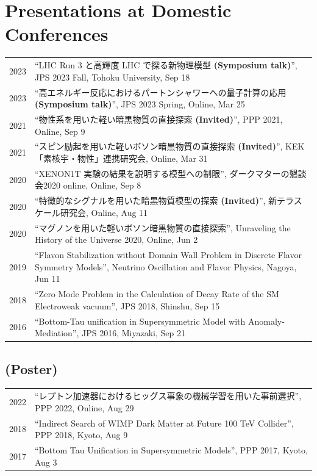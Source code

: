 \documentclass[12pt]{article}
\begin{document}
\section*{Presentations at Domestic Conferences}
\begin{longtable}[H]{lp{6in}}2023 & ``LHC Run 3 と高輝度 LHC で探る新物理模型 \textbf{(Symposium talk)}'', JPS 2023 Fall, Tohoku University, Sep 18 \\2023 & ``高エネルギー反応におけるパートンシャワーへの量子計算の応用 \textbf{(Symposium talk)}'', JPS 2023 Spring, Online, Mar 25 \\2021 & ``物性系を用いた軽い暗黒物質の直接探索 \textbf{(Invited)}'', PPP 2021, Online, Sep 9 \\2021 & ``スピン励起を用いた軽いボソン暗黒物質の直接探索 \textbf{(Invited)}'', KEK「素核宇・物性」連携研究会, Online, Mar 31 \\2020 & ``XENON1T 実験の結果を説明する模型への制限'', ダークマターの懇談会2020 online, Online, Sep 8 \\2020 & ``特徴的なシグナルを用いた暗黒物質模型の探索 \textbf{(Invited)}'', 新テラスケール研究会, Online, Aug 11 \\2020 & ``マグノンを用いた軽いボソン暗黒物質の直接探索'', Unraveling the History of the Universe 2020, Online, Jun 2 \\2019 & ``Flavon Stabilization without Domain Wall Problem in Discrete Flavor Symmetry Models'', Neutrino Oscillation and Flavor Physics, Nagoya, Jun 11 \\2018 & ``Zero Mode Problem in the Calculation of Decay Rate of the SM Electroweak vacuum'', JPS 2018, Shinshu, Sep 15 \\2016 & ``Bottom-Tau unification in Supersymmetric Model with Anomaly-Mediation'', JPS 2016, Miyazaki, Sep 21 \\\end{longtable}

\subsection*{(Poster)}
\begin{longtable}[H]{lp{6in}}2022 & ``レプトン加速器におけるヒッグス事象の機械学習を用いた事前選択'', PPP 2022, Online, Aug 29 \\2018 & ``Indirect Search of WIMP Dark Matter at Future 100 TeV Collider'', PPP 2018, Kyoto, Aug 9 \\2017 & ``Bottom Tau Unification in Supersymmetric Models'', PPP 2017, Kyoto, Aug 3 \\\end{longtable}
\end{document}
